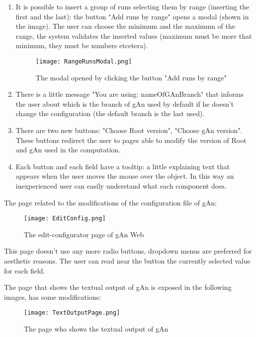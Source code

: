 \begin{enumerate}
\item It is possible to insert a group of runs selecting them by range (inserting the first and the last): the button "Add runs by range" opens a modal (shown in the image). The user can choose the minimum and the maximum of the range, the system validates the inserted values (maximum must be more that minimum, they must be numbers etcetera).

\begin{figure}[H]
\centering
\texttt{[image: RangeRunsModal.png]}  
\caption{The modal opened by clicking the button "Add runs by range"}
\end{figure}

\item There is a little message "You are using: nameOfGAnBranch" that informs the user about which is the branch of gAn used by default if he doesn't change the configuration (the default branch is the last used).

\item There are two new buttons: "Choose Root version", "Choose gAn version". These buttons redirect the user to pages able to modify the version of Root and gAn used in the computation.
 
\item Each button and each field have a tooltip: a little explaining text that appears when the user moves the mouse over the object. In this way an inexperienced user can easily understand what each component does.  

\end{enumerate}


The page related to the modifications of the configuration file of gAn:

\begin{figure}[H]
\centering
\texttt{[image: EditConfig.png]} 
\caption{The edit-configurator page of gAn Web}
\end{figure}

This page doesn't use any more radio buttons, dropdown menus are preferred for aesthetic reasons. The user can read near the button the currently selected value for each field. 


The page that shows the textual output of gAn is exposed in the following images, has some modifications:

\begin{figure}[H]
\centering
\texttt{[image: TextOutputPage.png]} 
\caption{The page who shows the textual output of gAn}
\end{figure}


